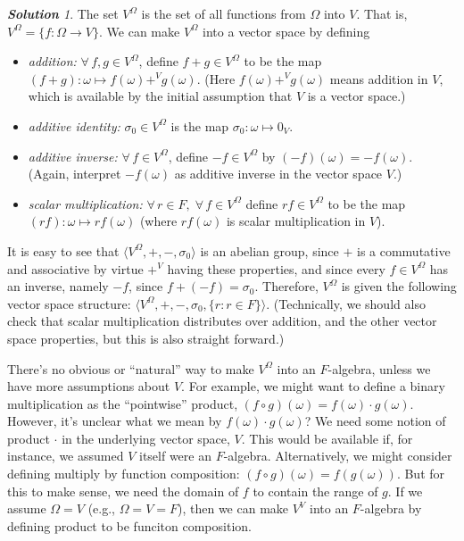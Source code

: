 \documentclass[11pt]{paper}
\theoremstyle{remark}
\newtheorem*{solution}{{\bf Solution}}
\newcommand\0{\ensuremath{\mathbf{0}}}
\newcommand{\<}{\ensuremath{\langle}}
\renewcommand{\>}{\ensuremath{\rangle}}
\begin{document}
\begin{solution}
The set $V^\Omega$ is the set of all functions from $\Omega$ into $V$. 
That is, $V^\Omega = \{f : \Omega \rightarrow V\}$. We can make $V^\Omega$ into a
vector space by defining
\begin{itemize}
\item {\it addition:} 
  $\forall \,f, g \in V^\Omega$, define 
  $f + g \in V^\Omega$ to be the map $(f+g):\omega \mapsto f(\omega) +^V
  g(\omega)$.
(Here $f(\omega) +^V g(\omega)$ means addition in $V$, which is available by the initial assumption that $V$ is a vector space.)
\item {\it additive identity:}
  $\sigma_0 \in V^\Omega$ is the map $\sigma_0:\omega \mapsto 0_V$.
\item   {\it additive inverse:}
  $\forall \, f\in V^\Omega$, define $-f \in V^\Omega$ by
  $(-f)(\omega) = - f(\omega)$. (Again,
  interpret $-f(\omega)$ as additive inverse in the vector space $V$.)
\item {\it scalar multiplication:} $\forall \, r\in F, \; \forall \,f\in V^\Omega$ 
  define $rf \in V^\Omega$ to be the map  $(rf): \omega \mapsto r
  f(\omega)$ (where $r f(\omega)$ is scalar multiplication in
  $V$).
\end{itemize}

It is easy to see that $\<V^\Omega, +, -, \sigma_0\>$ is an abelian group,
since $+$ is a commutative and associative by virtue $+^V$ having these
properties, and since every $f \in V^\Omega$ has an inverse, namely $-f$, 
since $f + (-f) = \sigma_0$. %
Therefore, $V^\Omega$ is given the following vector space structure:
$\<V^\Omega, +, -, \sigma_0, \{r : r \in F\}\>$.  (Technically, we should also
check that scalar multiplication distributes over addition, and the other
vector space properties, but this is also straight forward.)

There's no obvious or ``natural'' way to make  $V^\Omega$ into an
$F$-algebra, unless we have more assumptions about $V$.   For example, we might
want to define a binary multiplication as  the ``pointwise'' product, 
$(f\circ g)(\omega) = f(\omega) \cdot g(\omega)$. However, it's unclear what
we mean by $f(\omega) \cdot g(\omega)$?  We need some 
notion of product $\cdot$ in the underlying vector space, $V$.  This would be
available if, 
for instance, we assumed $V$ itself were an $F$-algebra.  Alternatively, we
might consider defining multiply by function composition: $(f\circ g)(\omega) =
f(g(\omega))$. But for this to make sense, we need the domain of $f$ to contain
the range of $g$. If we assume $\Omega = V$ (e.g., 
$\Omega = V = F$), then we can
make $V^V$ into an $F$-algebra by defining product to be funciton composition.

\end{solution}
\probskip
\end{document}
